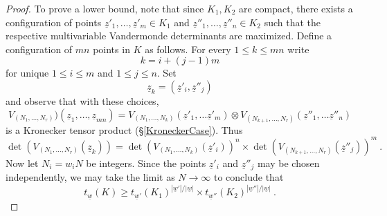 \documentclass[10pt,a4paper]{amsart}
\newcommand{\z}{\underline{z}}
\begin{document}
\begin{proof}
To prove a lower bound,  note that since $K_1, K_2$ are compact, there exists a configuration of points $\z'_1,\ldots, \z'_{m} \in K_1$ and $\z''_1,\ldots, \z''_n \in K_2$ such that 
the respective multivariable Vandermonde determinants are maximized.  
Define a configuration of $mn$ points in $K$ as follows. For every  $1\leq k \leq mn$ write
\[ k= i+ (j-1)  m  \]
for unique  $1\leq  i \leq m$ and $1\leq j\leq n$. Set 
\[ \z_k = (\z'_i, \z''_j)\]
and observe that with these choices, 
\[ V_{(N_1,\ldots, N_r)}) (\z_1,\ldots, \z_{mn}) =  V_{(N_1,\ldots, N_k)} (\z'_1,\ldots \z'_m) \otimes  V_{(N_{k+1},\ldots, N_r)} (\z''_1,\ldots \z''_n) \]
is a Kronecker tensor product (\S \ref{KroneckerCase}). Thus 
\[ \det( V_{(N_1,\ldots, N_r)} (\z_k )  )=  \det( V_{(N_1,\ldots, N_k)} (\z'_i))^{n}  \times \det( V_{(N_{k+1},\ldots, N_r)} (\z''_j))^m  \ .  \]
Now let $N_i = w_i N$ be  integers.   Since the points $\z'_i$  and $\z''_j$ may be chosen independently, we may take the limit as $N\rightarrow \infty$ to conclude that
\[   t_{\underline{w}} (K) \geq  t_{\underline{w}'} (K_1)^{|\underline{w}'|/|\underline{w}|} \times t_{{\underline{w}''}}(K_2)^{|\underline{w}''|/|\underline{w}|}\ .  \]
\end{proof} 
\end{document}
